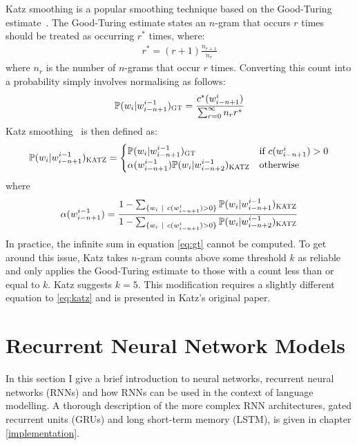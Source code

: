 \documentclass[a4paper, 12pt]{report}
\begin{document}
Katz smoothing is a popular smoothing technique based on the Good-Turing estimate~\cite{good_turing:good1953}. The Good-Turing estimate states an $n$-gram that occurs $r$ times should be treated as occurring $r^*$ times, where:
\begin{gather}
	r^* = (r + 1)\frac{n_{r + 1}}{n_r}
\end{gather}
where $n_r$ is the number of $n$-grams that occur $r$ times. Converting this count into a probability simply involves normalising as follows:
\begin{gather} \label{eq:gt}
	\mathbb{P}(w_i | w_{i - n + 1}^{i - 1})_{\text{\scshape GT}} = \frac{c^*(w_{i - n + 1}^{i})}{\sum_{r = 0}^\infty n_r r^*}
\end{gather}
Katz smoothing~\cite{katz_smoothing:katz1987} is then defined as:
\begin{gather} \label{eq:katz}
	\mathbb{P}(w_i | w_{i - n + 1}^{i - 1})_{\text{\scshape KATZ}} = \begin{cases}
		\mathbb{P}(w_i | w_{i - n + 1}^{i - 1})_{\text{\scshape GT}} &\text{if }c(w_{i - n + 1}^i) > 0 \\
		\alpha(w_{i - n + 1}^{i - 1})\mathbb{P}(w_i | w_{i - n + 2}^{i - 1})_{\text{\scshape KATZ}} &\text{otherwise}
	\end{cases}
\end{gather}
where
\begin{gather}
	\alpha(w_{i - n + 1}^{i - 1}) = \frac{1 - \sum_{\{w_i\ |\ c(w_{i - n + 1}^i) > 0\}} \mathbb{P}(w_i | w_{i - n + 1}^{i - 1})_{\text{\scshape KATZ}}}{1 - \sum_{\{w_i\ |\ c(w_{i - n + 1}^i) > 0\}} \mathbb{P}(w_i | w_{i - n + 2}^{i - 1})_{\text{\scshape KATZ}}}
\end{gather}
In practice, the infinite sum in equation \ref{eq:gt} cannot be computed. To get around this issue, Katz takes $n$-gram counts above some threshold $k$ as reliable and only applies the Good-Turing estimate to those with a count less than or equal to $k$. Katz suggests $k = 5$. This modification requires a slightly different equation to \ref{eq:katz} and is presented in Katz's original paper.

\section{Recurrent Neural Network Models}

In this section I give a brief introduction to neural networks, recurrent neural networks (RNNs) and how RNNs can be used in the context of language modelling. A thorough description of the more complex RNN architectures, gated recurrent units (GRUs) and long short-term memory (LSTM), is given in chapter \ref{implementation}.
\end{document}
